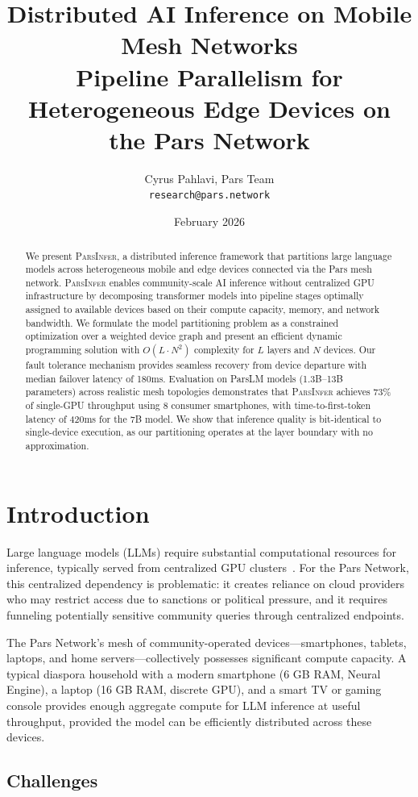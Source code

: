 \documentclass[11pt,a4paper]{article}
\title{Distributed AI Inference on Mobile Mesh Networks\\[0.5em]
\large Pipeline Parallelism for Heterogeneous Edge Devices on the Pars Network}
\author{
  Cyrus Pahlavi, Pars Team\\
  \texttt{research@pars.network}
}
\date{February 2026}
\newcommand{\parsdi}{\textsc{ParsInfer}\xspace}
\begin{document}
\parscoverpage


\begin{abstract}
We present \parsdi, a distributed inference framework that partitions large language models across heterogeneous mobile and edge devices connected via the Pars mesh network. \parsdi enables community-scale AI inference without centralized GPU infrastructure by decomposing transformer models into pipeline stages optimally assigned to available devices based on their compute capacity, memory, and network bandwidth. We formulate the model partitioning problem as a constrained optimization over a weighted device graph and present an efficient dynamic programming solution with $O(L \cdot N^2)$ complexity for $L$ layers and $N$ devices. Our fault tolerance mechanism provides seamless recovery from device departure with median failover latency of 180ms. Evaluation on ParsLM models (1.3B--13B parameters) across realistic mesh topologies demonstrates that \parsdi achieves 73\% of single-GPU throughput using 8 consumer smartphones, with time-to-first-token latency of 420ms for the 7B model. We show that inference quality is bit-identical to single-device execution, as our partitioning operates at the layer boundary with no approximation.
\end{abstract}

\section{Introduction}

Large language models (LLMs) require substantial computational resources for inference, typically served from centralized GPU clusters~\citep{pope2023efficiently}. For the Pars Network, this centralized dependency is problematic: it creates reliance on cloud providers who may restrict access due to sanctions or political pressure, and it requires funneling potentially sensitive community queries through centralized endpoints.

The Pars Network's mesh of community-operated devices---smartphones, tablets, laptops, and home servers---collectively possesses significant compute capacity. A typical diaspora household with a modern smartphone (6 GB RAM, Neural Engine), a laptop (16 GB RAM, discrete GPU), and a smart TV or gaming console provides enough aggregate compute for LLM inference at useful throughput, provided the model can be efficiently distributed across these devices.

\subsection{Challenges}
\end{document}

